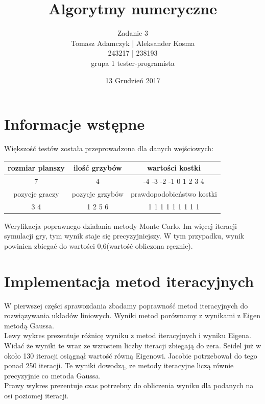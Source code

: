 \documentclass[8pt]{article}
\title{Algorytmy numeryczne}
\author{Zadanie 3 \\ Tomasz Adamczyk | Aleksander Kosma\\243217 | 238193\\grupa 1 tester-programista}
\date{13 Grudzień 2017}
\begin{document}
\maketitle 

\section*{Informacje wstępne}
Większość testów została przeprowadzona dla danych wejściowych:\\

\begin{center}
\begin{tabular}{  | c | c | c | }
  \hline
  rozmiar planszy & ilość grzybów & wartości kostki \\\hline
  7 &4& -4 -3 -2 -1 0 1 2 3 4\\\hline
   pozycje graczy & pozycje grzybów & prawdopodobieństwo kostki \\\hline
   3 4& 1 2 5 6& 1 1 1 1 1 1 1 1 1\\\hline
  \hline
\end{tabular} 
\end{center}

Weryfikacja poprawnego działania metody Monte Carlo. Im więcej iteracji symulacji gry, tym wynik staje się precyzyjniejszy. W tym przypadku, wynik powinien zbiegać do wartości 0,6(wartość obliczona ręcznie).
\begin{center}
\end{center}

\section*{Implementacja metod iteracyjnych}
W pierwszej części sprawozdania zbadamy poprawność metod iteracyjnych do rozwiązywania układów liniowych. Wyniki metod porównamy z wynikami z Eigen metodą Gaussa.\\ Lewy wykres prezentuje różnicę wyniku z metod iteracyjnych i wyniku Eigena. Widać że wyniki te wraz ze wzrostem liczby iteracji zbiegają do zera. Seidel już w około 130 iteracji osiągnął wartość równą Eigenowi. Jacobie potrzebował do tego  ponad 250 iteracji. Te wyniki dowodzą, ze metody iteracyjne liczą równie precyzyjnie co metoda Gaussa.\\
Prawy wykres prezentuje czas potrzebny do obliczenia wyniku dla podanych na osi poziomej iteracji.\\
\end{document}
